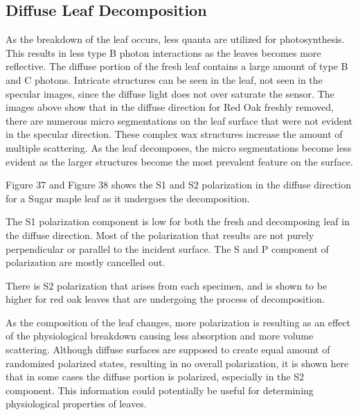 \subsection{Diffuse Leaf Decomposition}
As the breakdown of the leaf occurs, less quanta are utilized for photosynthesis.  This results in less type B photon interactions as the leaves becomes more reflective.  The diffuse portion of the fresh leaf contains a large amount of type B and C photons.  Intricate structures can be seen in the leaf, not seen in the specular images, since the diffuse light does not over saturate the sensor.
The images above show that in the diffuse direction for Red Oak freshly removed, there are numerous micro segmentations on the leaf surface that were not evident in the specular direction.  These complex wax structures increase the amount of multiple scattering.  As the leaf decomposes, the micro segmentations become less evident as the larger structures become the most prevalent feature on the surface.

Figure 37 and Figure 38 shows the S1 and S2 polarization in the diffuse direction for a Sugar maple leaf as it undergoes the decomposition.
%
\begin{center}
\end{center}
%
The S1 polarization component is low for both the fresh and decomposing leaf in the diffuse direction.  Most of the polarization that results are not purely perpendicular or parallel to the incident surface.  The S and P component of polarization are mostly cancelled out.
%
\begin{center}
\end{center}
%
There is S2 polarization that arises from each specimen, and is shown to be higher for red oak leaves that are undergoing the process of decomposition.

As the composition of the leaf changes, more polarization is resulting as an effect of the physiological breakdown causing less absorption and more volume scattering.  Although diffuse surfaces are supposed to create equal amount of randomized polarized states, resulting in no overall polarization, it is shown here that in some cases the diffuse portion is polarized, especially in the S2 component.  This information could potentially be useful for determining physiological properties of leaves.

